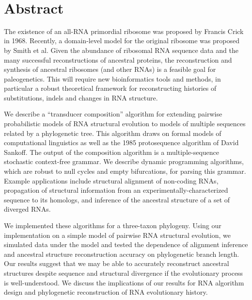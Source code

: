 \documentclass[10pt]{article}
\date{}
\begin{document}
\begin{flushleft}
  {\Large
    \textbf{\titlestring}
  }
\\
\authorstring
\end{flushleft}


\newpage
\section*{Abstract}
The existence of an all-RNA primordial ribosome was proposed by
Francis Crick in 1968.  Recently, a domain-level model for the
original ribosome was proposed by Smith et al.  Given the abundance of
ribosomal RNA sequence data and the many successful reconstructions of
ancestral proteins, the reconstruction and synthesis of ancestral
ribosomes (and other RNAs) is a feasible goal for paleogenetics.  This
will require new bioinformatics tools and methods, in particular a
robust theoretical framework for reconstructing histories of
substitutions, indels and changes in RNA structure.

We describe a ``transducer composition'' algorithm for extending
pairwise probabilistic models of RNA structural evolution to models of
multiple sequences related by a phylogenetic tree.  This algorithm
draws on formal models of computational linguistics as well as the
1985 protosequence algorithm of David Sankoff.  The output of the
composition algorithm is a multiple-sequence stochastic context-free
grammar.  We describe dynamic programming algorithms, which are robust
to null cycles and empty bifurcations, for parsing this grammar.
Example applications include structural alignment of non-coding RNAs,
propagation of structural information from an
experimentally-characterized sequence to its homologs, and inference
of the ancestral structure of a set of diverged RNAs.

We implemented these algorithms for a three-taxon phylogeny.  Using
our implementation on a simple model of pairwise RNA structural
evolution, we simulated data under the model and tested the dependence
of alignment inference and ancestral structure reconstruction accuracy on phylogenetic branch length.
Our results suggest that
we may be able to accurately reconstruct ancestral structures despite
sequence and structural divergence if the evolutionary process is
well-understood.
We discuss the implications of our results for RNA algorithm design
and phylogenetic reconstruction of RNA evolutionary history.
\end{document}
